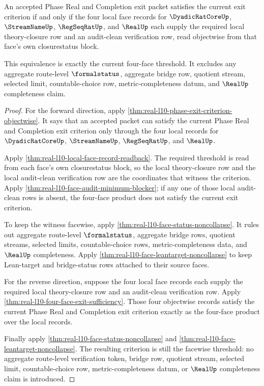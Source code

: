 \begin{theorem}
\label{thm:real-l10-objectwise-exit-threshold-equivalence}
An accepted Phase Real and Completion exit packet satisfies the current exit
criterion if and only if the four local face records for
$\DyadicRatCoreUp$, $\StreamNameUp$, $\RegSeqRatUp$, and $\RealUp$ each
supply the required local theory-closure row and an audit-clean verification
row, read objectwise from that face's own closurestatus block.

This equivalence is exactly the current four-face threshold. It excludes any
aggregate route-level $\formalstatus$, aggregate bridge row, quotient stream,
selected limit, countable-choice row, metric-completeness datum, and
$\RealUp$ completeness claim.
\end{theorem}
\begin{proof}
For the forward direction, apply
\autoref{thm:real-l10-phase-exit-criterion-objectwise}. It says that an
accepted packet can satisfy the current Phase Real and Completion exit
criterion only through the four local records for $\DyadicRatCoreUp$,
$\StreamNameUp$, $\RegSeqRatUp$, and $\RealUp$.

Apply \autoref{thm:real-l10-local-face-record-readback}. The required
threshold is read from each face's own closurestatus block, so the local
theory-closure row and the local audit-clean verification row are the
coordinates that witness the criterion. Apply
\autoref{thm:real-l10-face-audit-minimum-blocker}; if any one of those
local audit-clean rows is absent, the four-face product does not satisfy the
current exit criterion.

To keep the witness facewise, apply
\autoref{thm:real-l10-face-status-noncollapse}. It rules out aggregate
route-level $\formalstatus$, aggregate bridge rows, quotient streams,
selected limits, countable-choice rows, metric-completeness data, and
$\RealUp$ completeness. Apply
\autoref{thm:real-l10-face-leantarget-noncollapse} to keep Lean-target and
bridge-status rows attached to their source faces.

For the reverse direction, suppose the four local face records each supply
the required local theory-closure row and an audit-clean verification row.
Apply \autoref{thm:real-l10-four-face-exit-sufficiency}. Those four
objectwise records satisfy the current Phase Real and Completion exit
criterion exactly as the four-face product over the local records.

Finally apply \autoref{thm:real-l10-face-status-noncollapse} and
\autoref{thm:real-l10-face-leantarget-noncollapse}. The resulting criterion
is still the facewise threshold: no aggregate route-level verification token,
bridge row, quotient stream, selected limit, countable-choice row,
metric-completeness datum, or $\RealUp$ completeness claim is introduced.
\end{proof}

